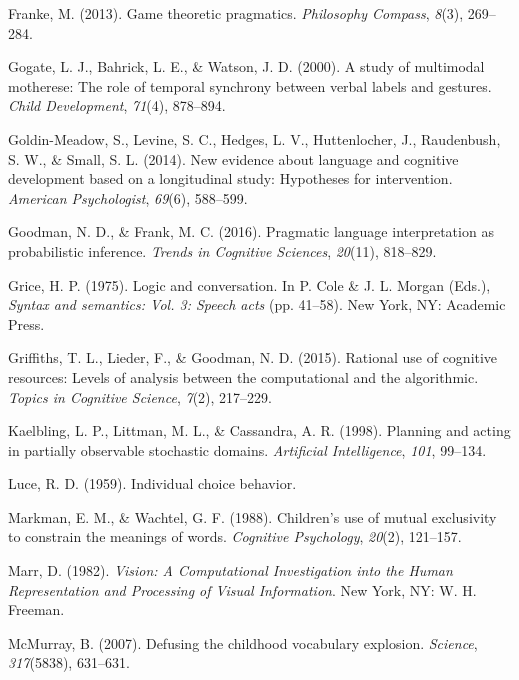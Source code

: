 \documentclass[english,,man,floatsintext]{apa6}
\begin{document}
\leavevmode\hypertarget{ref-franke2013}{}%
Franke, M. (2013). Game theoretic pragmatics. \emph{Philosophy Compass}, \emph{8}(3), 269--284.

\leavevmode\hypertarget{ref-gogate2000}{}%
Gogate, L. J., Bahrick, L. E., \& Watson, J. D. (2000). A study of multimodal motherese: The role of temporal synchrony between verbal labels and gestures. \emph{Child Development}, \emph{71}(4), 878--894.

\leavevmode\hypertarget{ref-goldin-meadow2014}{}%
Goldin-Meadow, S., Levine, S. C., Hedges, L. V., Huttenlocher, J., Raudenbush, S. W., \& Small, S. L. (2014). New evidence about language and cognitive development based on a longitudinal study: Hypotheses for intervention. \emph{American Psychologist}, \emph{69}(6), 588--599.

\leavevmode\hypertarget{ref-goodman2016}{}%
Goodman, N. D., \& Frank, M. C. (2016). Pragmatic language interpretation as probabilistic inference. \emph{Trends in Cognitive Sciences}, \emph{20}(11), 818--829.

\leavevmode\hypertarget{ref-grice1975}{}%
Grice, H. P. (1975). Logic and conversation. In P. Cole \& J. L. Morgan (Eds.), \emph{Syntax and semantics: Vol. 3: Speech acts} (pp. 41--58). New York, NY: Academic Press.

\leavevmode\hypertarget{ref-griffiths2015}{}%
Griffiths, T. L., Lieder, F., \& Goodman, N. D. (2015). Rational use of cognitive resources: Levels of analysis between the computational and the algorithmic. \emph{Topics in Cognitive Science}, \emph{7}(2), 217--229.

\leavevmode\hypertarget{ref-kaelbling1998}{}%
Kaelbling, L. P., Littman, M. L., \& Cassandra, A. R. (1998). Planning and acting in partially observable stochastic domains. \emph{Artificial Intelligence}, \emph{101}, 99--134.

\leavevmode\hypertarget{ref-luce1959}{}%
Luce, R. D. (1959). Individual choice behavior.

\leavevmode\hypertarget{ref-markman1988}{}%
Markman, E. M., \& Wachtel, G. F. (1988). Children's use of mutual exclusivity to constrain the meanings of words. \emph{Cognitive Psychology}, \emph{20}(2), 121--157.

\leavevmode\hypertarget{ref-marr1982}{}%
Marr, D. (1982). \emph{Vision: A Computational Investigation into the Human Representation and Processing of Visual Information}. New York, NY: W. H. Freeman.

\leavevmode\hypertarget{ref-mcmurray2007}{}%
McMurray, B. (2007). Defusing the childhood vocabulary explosion. \emph{Science}, \emph{317}(5838), 631--631.
\end{document}
